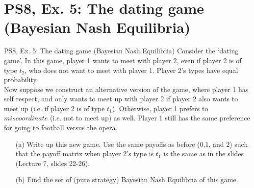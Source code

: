 \section{PS8, Ex. 5: The dating game (Bayesian Nash Equilibria)}

\begin{frame}{PS8, Ex. 5: The dating game (Bayesian Nash Equilibria)}
    Consider the ‘dating game’. In this game, player 1 wants to meet with player 2, even if player 2 is of type $t_2$, who does not want to meet with player 1. Player 2’s types have equal probability.\\\medskip
    Now suppose we construct an alternative version of the game, where player 1 has self respect, and only wants to meet up with player 2 if player 2 also wants to meet up (i.e. if player 2 is of type $t_1$). Otherwise, player 1 prefers to $miscoordinate$ (i.e. not to meet up) as well. Player 1 still has the same preference for going to football versus the opera.
    \begin{itemize}
      \item[(a)] Write up this new game. Use the same payoffs as before (0,1, and 2) such that the payoff matrix when player 2’s type is $t_1$ is the same as in the slides (Lecture 7, slides 22-26).
      \item[(b)] Find the set of (pure strategy) Bayesian Nash Equilibria of this game.
    \end{itemize}
    \vfill\null
\end{frame}
